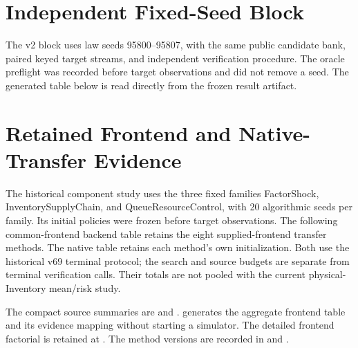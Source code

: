 \documentclass[opre,dblanonrev]{informs4}
\begin{document}
\section{Independent Fixed-Seed Block}

The v2 block uses law seeds 95800--95807, with the same public candidate bank,
paired keyed target streams, and independent verification procedure.  The
oracle preflight was recorded before target observations and did not remove a
seed.  The generated table below is read directly from the frozen result
artifact.



\section{Retained Frontend and Native-Transfer Evidence}

The historical component study uses the three fixed families FactorShock,
InventorySupplyChain, and QueueResourceControl, with 20 algorithmic seeds
per family.  Its initial policies were frozen before target observations.
The following common-frontend backend table retains the eight supplied-frontend
transfer methods.  The native table retains each method's own initialization.
Both use the historical v69 terminal protocol; the search and source budgets
are separate from terminal verification calls.  Their totals are not pooled
with the current physical-Inventory mean/risk study.

\begin{table}[htbp]
\centering
\small
\caption{Historical supplied-frontend backend comparison. Every transfer method
receives the frozen frontend, 384 source calls and 13 target search calls.}
\label{tab:mp_legacy_backend}
\resizebox{\textwidth}{!}{}
\end{table}

\begin{table}[htbp]
\centering
\small
\caption{Historical native transfer comparison. Each method retains its
own initialization and adaptation with the same source and search budgets.}
\label{tab:mp_legacy_native}
\resizebox{0.92\textwidth}{!}{}
\end{table}

The compact source summaries are
 and
.
 generates the
aggregate frontend table and its evidence mapping without starting a
simulator.  The detailed frontend factorial is retained at
.  The method versions are recorded in
and .
\end{document}
